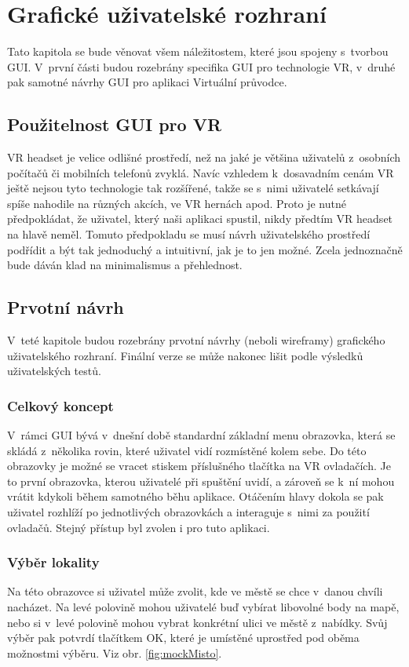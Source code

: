 \documentclass[thesis=B,czech]{FITthesis}[2012/06/26]
\begin{document}
	\section{Grafické uživatelské rozhraní}
	\label{sec:GUI}
	
	Tato kapitola se bude věnovat všem náležitostem, které jsou spojeny s~tvorbou GUI. V~první části budou rozebrány specifika GUI pro technologie VR, v~druhé pak samotné návrhy GUI pro aplikaci Virtuální průvodce.
	
	
	\subsection{Použitelnost GUI pro VR}
VR headset je velice odlišné prostředí, než na jaké je většina uživatelů z~osobních počítačů či mobilních telefonů zvyklá. Navíc vzhledem k~dosavadním cenám VR ještě nejsou tyto technologie tak rozšířené, takže se s~nimi uživatelé setkávají spíše nahodile na různých akcích, ve VR hernách apod. Proto je nutné předpokládat, že uživatel, který naši aplikaci spustil, nikdy předtím VR headset na hlavě neměl. Tomuto předpokladu se musí návrh uživatelského prostředí podřídit a být tak jednoduchý a intuitivní, jak je to jen možné. Zcela jednoznačně bude dáván klad na minimalismus a přehlednost.
	
	\subsection{Prvotní návrh}
V~teté kapitole budou rozebrány prvotní návrhy (neboli wireframy) grafického uživatelského rozhraní. Finální verze se může nakonec lišit podle výsledků uživatelských testů.

	\subsubsection{Celkový koncept}
V~rámci GUI bývá v~dnešní době standardní základní menu obrazovka, která se skládá z~několika rovin, které uživatel vidí rozmístěné kolem sebe. Do této obrazovky je možné se vracet stiskem příslušného tlačítka na VR ovladačích. Je to první obrazovka, kterou uživatelé při spuštění uvidí, a zároveň se k~ní mohou vrátit kdykoli během samotného běhu aplikace. Otáčením hlavy dokola se pak uživatel rozhlíží po jednotlivých obrazovkách a interaguje s~nimi za použití ovladačů. Stejný přístup byl zvolen i pro tuto aplikaci. 

	\subsubsection{Výběr lokality}
Na této obrazovce si uživatel může zvolit, kde ve městě se chce v~danou chvíli nacházet. Na levé polovině mohou uživatelé buď vybírat libovolné body na mapě, nebo si v~levé polovině mohou vybrat konkrétní ulici ve městě z~nabídky.  Svůj výběr pak potvrdí tlačítkem OK, které je umístěné uprostřed pod oběma možnostmi výběru. Viz obr. \ref{fig:mockMisto}.
\end{document}
